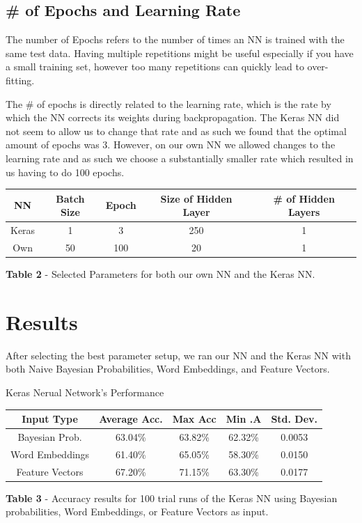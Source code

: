 \documentclass[11pt,onecolumn]{article} %
\begin{document}
	\subsection{\# of Epochs and Learning Rate}
	The number of Epochs refers to the number of times an NN is trained with the same test data. Having multiple repetitions might be useful especially if you have a small training set, however too many repetitions can quickly lead to over-fitting. 
	\par The \# of epochs is directly related to the learning rate, which is the rate by which the NN corrects its weights during backpropagation. The Keras NN did not seem to allow us to change that rate and as such we found that the optimal amount of epochs was 3. However, on our own NN we allowed changes to the learning rate and as such we choose a substantially smaller rate which resulted in us having to do 100 epochs.
	
	\begin{center}
		\begin{tabular}{| c | c | c | c | c |}
			\hline
			NN & Batch Size & Epoch & Size of Hidden Layer & \# of Hidden Layers\\
			\hline
			Keras & 1 & 3 &  250 & 1 \\
			\hline
			Own & 50 & 100 &  20 & 1 \\
			\hline
		\end{tabular}
		\newline
		\newline
		\textbf{Table 2 } - Selected Parameters for both our own NN and the Keras NN.
	\end{center}
	
	
	\section{Results}
	After selecting the best parameter setup, we ran our NN and the Keras NN with both Naive Bayesian Probabilities, Word Embeddings, and Feature Vectors.
	
	
	\begin{center}
		Keras Nerual Network's Performance
		\begin{tabular}{ | c | c | c | c | c |}
			
			\hline
			Input Type & Average Acc.  & Max Acc & Min .A& Std. Dev. \\
			\hline
			Bayesian Prob. & 63.04\% & 63.82\% & 62.32\% & 0.0053 \\
			\hline
			Word Embeddings & 61.40\% &	65.05\% & 58.30\% & 0.0150 \\
			\hline
			Feature Vectors & 67.20\% & 71.15\% & 63.30\% & 0.0177 \\
			\hline
		\end{tabular}
		\newline
		\newline
		\textbf{Table 3} - Accuracy results for 100 trial runs of the Keras NN using Bayesian probabilities, Word Embeddings, or Feature Vectors as input.
	\end{center}
	
\end{document}
